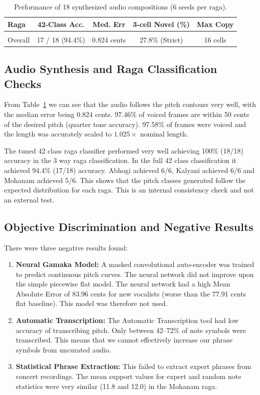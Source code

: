 \documentclass[conference,letterpaper]{IEEEtran}
\begin{document}
\begin{table}[t]
\caption{Performance of 18 synthesized audio compositions (6 seeds per raga).}
\label{tab:audio}
\centering\footnotesize
\setlength{\tabcolsep}{3.8pt}
\begin{tabular}{@{}lcccc@{}}
\toprule
Raga & 42-Class Acc. & Med. Err & 3-cell Novel (\%) & Max Copy\\
\midrule
\\
\midrule
Overall & 17 / 18 (94.4\%) & 0.824 cents & 27.8\% (Strict) & 16 cells\\
\bottomrule
\end{tabular}
\end{table}

\subsection{Audio Synthesis and Raga Classification Checks}
From Table~\ref{tab:audio} we can see that the audio follows the pitch contours very well, with the median error being 0.824 cents. 97.46\% of voiced frames are within 50 cents of the desired pitch (quarter tone accuracy). 97.58\% of frames were voiced and the length was accurately scaled to $1.025\times$ nominal length.

The tuned 42 class raga classifier performed very well achieving 100\% (18/18) accuracy in the 3 way raga classification. In the full 42 class classification it achieved 94.4\% (17/18) accuracy. Abhogi achieved 6/6, Kalyani achieved 6/6 and Mohanam achieved 5/6. This shows that the pitch classes generated follow the expected distribution for each raga. This is an internal consistency check and not an external test.

\subsection{Objective Discrimination and Negative Results}
There were three negative results found:
\begin{enumerate}
    \item \textbf{Neural Gamaka Model:} A masked convolutional auto-encoder was trained to predict continuous pitch curves. The neural network did not improve upon the simple piecewise flat model. The neural network had a high Mean Absolute Error of 83.96 cents for new vocalists (worse than the 77.91 cents flat baseline). This model was therefore not used.
    \item \textbf{Automatic Transcription:} The Automatic Transcription tool had low accuracy of transcribing pitch. Only between 42--72\% of note symbols were transcribed. This means that we cannot effectively increase our phrase symbols from uncurated audio.
    \item \textbf{Statistical Phrase Extraction:} This failed to extract expert phrases from concert recordings. The mean support values for expert and random note statistics were very similar (11.8 and 12.0) in the Mohanam raga.
\end{enumerate}
\end{document}
